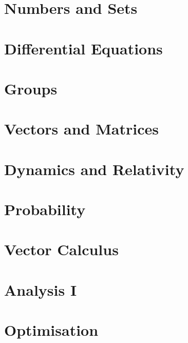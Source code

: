 \documentclass{book}
\begin{document}
\let\maketitle\ignorespaces{}
\renewcommand{\tableofcontentsnewpage}{}

\chapter{Numbers and Sets}

\chapter{Differential Equations}

\chapter{Groups}

\chapter{Vectors and Matrices}

\chapter{Dynamics and Relativity}

\chapter{Probability}

\chapter{Vector Calculus}

\chapter{Analysis I}


\chapter{Optimisation}

\end{document}
